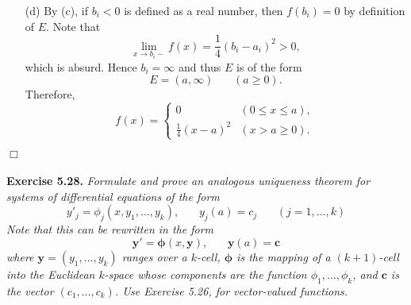 \documentclass{article}
\begin{document}
\begin{enumerate}
\begin{enumerate}
  \item[(d)]
  By (c), if $b_i < 0$ is defined as a real number,
  then $f(b_i) = 0$ by definition of $E$.
  Note that
  \[
    \lim_{x \to b_i-} f(x) = \frac{1}{4}(b_i - a_i)^2 > 0,
  \]
  which is absurd.
  Hence $b_i = \infty$ and thus $E$ is of the form
  \[
    E = (a,\infty) \:\:\:\:\:\:\:\: (a \geq 0).
  \]
  Therefore,
  \begin{equation*}
  f(x) =
    \begin{cases}
      0                    & (0 \leq x \leq a), \\
      \frac{1}{4}(x - a)^2 & (x > a \geq 0).
    \end{cases}
  \end{equation*}
  \end{enumerate}
\end{enumerate}
$\Box$ \\\\






\textbf{Exercise 5.28.}
\emph{Formulate and prove an analogous uniqueness theorem for
systems of differential equations of the form
\[
  y'_j = \phi_j(x, y_1, \ldots, y_k), \:\:\:\:\:\:\:\:
  y_j(a) = c_j \:\:\:\:\:\:\:\:
  (j = 1, \ldots, k)
\]
Note that this can be rewritten in the form
\[
  \mathbf{y}' = \bm{\phi}(x,\mathbf{y}), \:\:\:\:\:\:\:\:
  \mathbf{y}(a) = \mathbf{c}
\]
where $\mathbf{y} = (y_1, \ldots, y_k)$ ranges over a $k$-cell,
$\bm{\phi}$ is the mapping of a $(k+1)$-cell into the Euclidean $k$-space
whose components are the function $\phi_1, \ldots, \phi_k$,
and $\mathbf{c}$ is the vector $(c_1, \ldots, c_k)$.
Use Exercise 5.26, for vector-valued functions.} \\
\end{document}
